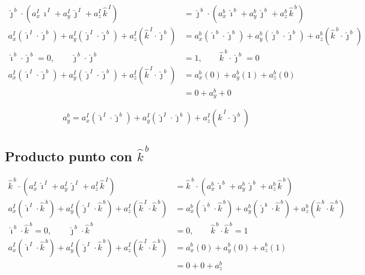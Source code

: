 \documentclass[11pt,a4paper]{article}
\begin{document}
\begin{align}
  \hat{\jmath}^{\,b}\cdot\left( a_x^{I}\,\hat{\imath}^{\,I} + a_y^{I}\,\hat{\jmath}^{\,I} + a_z^{I}\,\hat{k}^{\,I} \right)
  &= \hat{\jmath}^{\,b}\cdot\left( a_x^{b}\,\hat{\imath}^{\,b} + a_y^{b}\,\hat{\jmath}^{\,b} + a_z^{b}\,\hat{k}^{\,b} \right) \\[6pt]
  a_x^{I}\left(\hat{\imath}^{\,I}\cdot\hat{\jmath}^{\,b}\right)
  + a_y^{I}\left(\hat{\jmath}^{\,I}\cdot\hat{\jmath}^{\,b}\right)
  + a_z^{I}\left(\hat{k}^{\,I}\cdot\hat{\jmath}^{\,b}\right)
  &= a_x^{b}\left(\hat{\imath}^{\,b}\cdot\hat{\jmath}^{\,b}\right)
  + a_y^{b}\left(\hat{\jmath}^{\,b}\cdot\hat{\jmath}^{\,b}\right)
  + a_z^{b}\left(\hat{k}^{\,b}\cdot\hat{\jmath}^{\,b}\right) \\[6pt]
  \hat{\imath}^{\,b}\cdot\hat{\jmath}^{\,b} = 0, \qquad
  \hat{\jmath}^{\,b}\cdot\hat{\jmath}^{\,b} &= 1, \qquad
  \hat{k}^{\,b}\cdot\hat{\jmath}^{\,b} = 0 \\[6pt]
  a_x^{I}\left(\hat{\imath}^{\,I}\cdot\hat{\jmath}^{\,b}\right)
  + a_y^{I}\left(\hat{\jmath}^{\,I}\cdot\hat{\jmath}^{\,b}\right)
  + a_z^{I}\left(\hat{k}^{\,I}\cdot\hat{\jmath}^{\,b}\right)
  &= a_x^{b}(0) + a_y^{b}(1) + a_z^{b}(0) \\[6pt]
  &= 0 + a_y^{b} + 0
\end{align}

\begin{equation}
  \boxed{\;a_y^{b} = a_x^{I}\left(\hat{\imath}^{\,I}\cdot\hat{\jmath}^{\,b}\right)
  + a_y^{I}\left(\hat{\jmath}^{\,I}\cdot\hat{\jmath}^{\,b}\right)
  + a_z^{I}\left(\hat{k}^{\,I}\cdot\hat{\jmath}^{\,b}\right)\;}
\end{equation}

\subsection*{Producto punto con $\hat{k}^{\,b}$}

\begin{align}
  \hat{k}^{\,b}\cdot\left( a_x^{I}\,\hat{\imath}^{\,I} + a_y^{I}\,\hat{\jmath}^{\,I} + a_z^{I}\,\hat{k}^{\,I} \right)
  &= \hat{k}^{\,b}\cdot\left( a_x^{b}\,\hat{\imath}^{\,b} + a_y^{b}\,\hat{\jmath}^{\,b} + a_z^{b}\,\hat{k}^{\,b} \right) \\[6pt]
  a_x^{I}\left(\hat{\imath}^{\,I}\cdot\hat{k}^{\,b}\right)
  + a_y^{I}\left(\hat{\jmath}^{\,I}\cdot\hat{k}^{\,b}\right)
  + a_z^{I}\left(\hat{k}^{\,I}\cdot\hat{k}^{\,b}\right)
  &= a_x^{b}\left(\hat{\imath}^{\,b}\cdot\hat{k}^{\,b}\right)
  + a_y^{b}\left(\hat{\jmath}^{\,b}\cdot\hat{k}^{\,b}\right)
  + a_z^{b}\left(\hat{k}^{\,b}\cdot\hat{k}^{\,b}\right) \\[6pt]
  \hat{\imath}^{\,b}\cdot\hat{k}^{\,b} = 0, \qquad
  \hat{\jmath}^{\,b}\cdot\hat{k}^{\,b} &= 0, \qquad
  \hat{k}^{\,b}\cdot\hat{k}^{\,b} = 1 \\[6pt]
  a_x^{I}\left(\hat{\imath}^{\,I}\cdot\hat{k}^{\,b}\right)
  + a_y^{I}\left(\hat{\jmath}^{\,I}\cdot\hat{k}^{\,b}\right)
  + a_z^{I}\left(\hat{k}^{\,I}\cdot\hat{k}^{\,b}\right)
  &= a_x^{b}(0) + a_y^{b}(0) + a_z^{b}(1) \\[6pt]
  &= 0 + 0 + a_z^{b}
\end{align}
\end{document}
